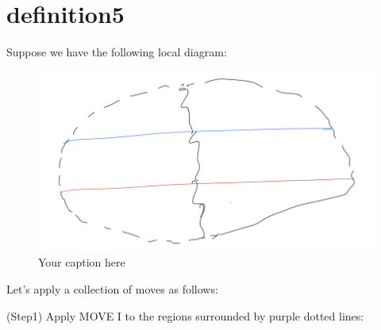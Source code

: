 \section{definition5}
\begin{definition}
\end{definition}
Suppose we have the following local diagram:

\begin{figure}[H] %
    \centering
    \includegraphics[width=\linewidth]{diagrams/definition5/1.png} %
    \caption{Your caption here}
    \label{fig:your-label}
\end{figure}

Let's apply a collection of moves as follows:

(Step1) Apply MOVE \RN{1} to the regions surrounded by purple dotted lines:

